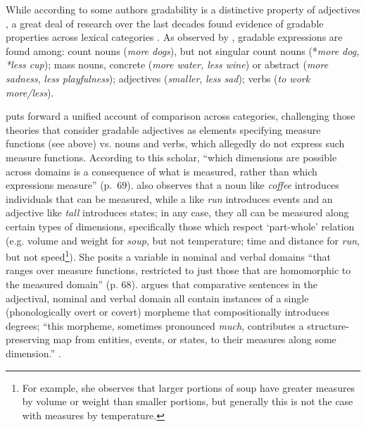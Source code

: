 \documentclass[output=paper]{langsci/langscibook}
\begin{document}
While according to some authors gradability is a distinctive property of
adjectives %
\citep[see e.g.][]{Jackendoff1977}%
%
, a great deal of research over the
last decades found evidence of gradable properties across lexical
categories %
\citep[see e.g.][]{Bolinger1972,Bresnan1973,Doetjes1997a,NeelemanVandeKootEtAl2004,CaudalNicolas2005,Bochnak2010}%
%
. As observed
by %
\citet{Nicolas2010}%
%
, gradable expressions are found among:  count
nouns (\emph{more dogs}), but not singular count nouns (*\emph{more dog,
*less cup}); mass nouns, concrete (\emph{more water, less wine}) or
abstract (\emph{more sadness}, \emph{less playfulness}); adjectives
(\emph{smaller}, \emph{less sad}); verbs (\emph{to work more/less}).

%
\citet{Wellwood2015} %
%
puts forward a unified account of comparison across
categories, challenging those theories that consider gradable adjectives
as elements specifying measure functions (see above) vs. nouns and
verbs, which allegedly do not express such measure functions. According
to this scholar, ``which dimensions are possible across domains is a
consequence of what is measured, rather than which expressions measure''
(p.~69). %
\citet[69]{Wellwood2015} %
%
also observes that a noun like \emph{coffee}
introduces individuals that can be measured, while a  like
\emph{run} introduces events and an adjective like \emph{tall}
introduces states; in any case, they all can be measured along certain
types of dimensions, specifically those which respect `part-whole'
relation (e.g. volume and weight for \emph{soup}, but not temperature;
time and distance for \emph{run}, but not speed\footnote{For example,
  she observes that larger portions of soup have greater measures by
  volume or weight than smaller portions, but generally this is not the
  case with measures by temperature.}). She posits a variable in nominal
and verbal domains ``that ranges over measure functions, restricted to
just those that are homomorphic to the measured domain'' (p. 68).
%
\citet{Wellwood2014,Wellwood2015} %
%
argues that comparative sentences in the
adjectival, nominal and verbal domain all contain instances of a single
(phonologically overt or covert) morpheme that compositionally
introduces degrees; ``this morpheme, sometimes pronounced \emph{much},
contributes a structure-preserving map from entities, events, or states,
to their measures along some dimension.'' %
\citep[67]{Wellwood2015}%
%
.
\end{document}
